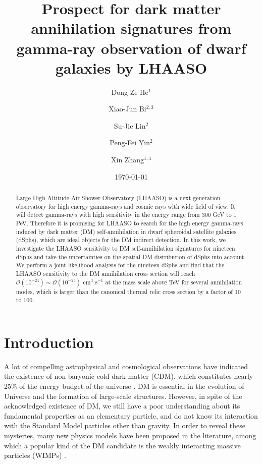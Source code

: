 \documentclass[12pt,aps,prd,amsmath,amssymb,showpacs,floats,floatfix,nofootinbib]{revtex4-1}
\begin{document}
\title{Prospect for dark matter annihilation signatures from gamma-ray observation of dwarf galaxies by LHAASO}

\author{Dong-Ze He$^1$}
\author{Xiao-Jun Bi$^{2,3}$}
\author{Su-Jie Lin$^2$}
\author{Peng-Fei Yin$^2$}
\author{Xin Zhang$^{1,4}$}
\date{\today}


\begin{abstract}
Large High Altitude Air Shower Observatory (LHAASO) is a next generation observatory for high energy gamma-rays and cosmic rays with wide field of view. It will detect gamma-rays with high sensitivity in the energy range from 300 GeV to 1 PeV. Therefore it is promising for LHAASO to search for the high energy gamma-rays induced by dark matter (DM) self-annihilation in dwarf spheroidal satellite galaxies (dSphs), which are ideal objects for the DM indirect detection. In this work, we investigate the LHAASO sensitivity to DM self-annihilation signatures for nineteen dSphs and take the uncertainties on the spatial DM distribution of dSphs into account. We perform a joint likelihood analysis for the nineteen dSphs and find that the LHAASO sensitivity to the DM annihilation cross section will reach $\mathcal{O}(10^{-24})\sim \mathcal{O}(10^{-25})$ cm$^3$ s$^{-1}$ at the mass scale above TeV for several annihilation modes, which is larger than the canonical thermal relic cross section by a factor of 10 to 100.
\end{abstract}

\maketitle


\section{Introduction}\label{sec:intro}
A lot of compelling astrophysical and cosmological observations have indicated the existence of non-baryonic cold dark matter (CDM),
which constitutes nearly 25\% of the energy budget of the universe \cite{Adam:2015rua}.
DM is essential in the evolution of Universe and the formation of large-scale structures. However, in spite of the acknowledged existence of DM, we still have a poor understanding about its fundamental properties as an elementary particle, and do not know its interaction with the Standard Model particles other than gravity. In order to reveal these mysteries, many new physics models have been proposed in the literature, among which a popular kind of the DM candidate is the weakly interacting massive particles (WIMPs) \cite{Jungman:1995df,Bergstrom:2000pn,Bertone:2004pz}.
\end{document}
